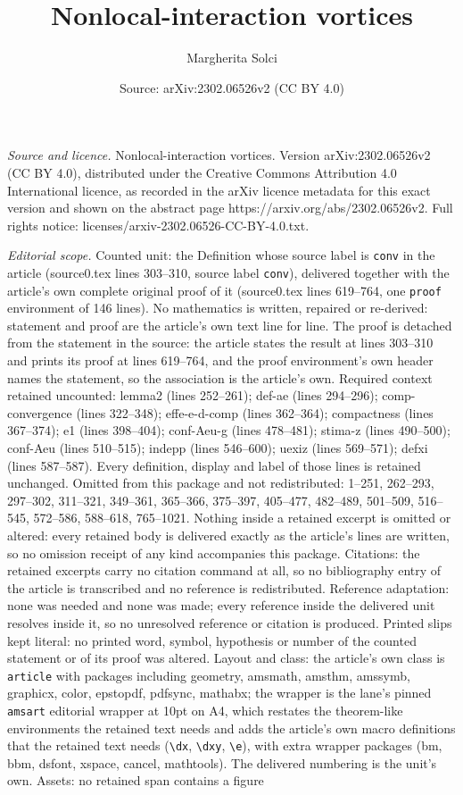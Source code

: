 \documentclass[10pt,a4paper]{amsart}
\title[Nonlocal-interaction vortices]{Nonlocal-interaction vortices}
\author{Margherita Solci}
\date{Source: arXiv:2302.06526v2 (CC BY 4.0)}
\begin{document}
\maketitle

\noindent\emph{Source and licence.} Nonlocal-interaction vortices. Version arXiv:2302.06526v2 (CC BY 4.0), distributed under the Creative Commons Attribution 4.0 International licence, as recorded in the arXiv licence metadata for this exact version and shown on the abstract page https://arxiv.org/abs/2302.06526v2. Full rights notice: licenses/arxiv-2302.06526-CC-BY-4.0.txt.\par\smallskip

\noindent\textit{Editorial scope.} Counted unit: the Definition whose source label is \texttt{conv} in the article (source0.tex lines 303--310, source label \texttt{conv}), delivered together with the article's own complete original proof of it (source0.tex lines 619--764, one \texttt{proof} environment of 146 lines). No mathematics is written, repaired or re-derived: statement and proof are the article's own text line for line. The proof is detached from the statement in the source: the article states the result at lines 303--310 and prints its proof at lines 619--764, and the proof environment's own header names the statement, so the association is the article's own. Required context retained uncounted: lemma2 (lines 252--261); def-ae (lines 294--296); comp-convergence (lines 322--348); effe-e-d-comp (lines 362--364); compactness (lines 367--374); e1 (lines 398--404); conf-Aeu-g (lines 478--481); stima-z (lines 490--500); conf-Aeu (lines 510--515); indepp (lines 546--600); uexiz (lines 569--571); defxi (lines 587--587). Every definition, display and label of those lines is retained unchanged. Omitted from this package and not redistributed: 1--251, 262--293, 297--302, 311--321, 349--361, 365--366, 375--397, 405--477, 482--489, 501--509, 516--545, 572--586, 588--618, 765--1021. Nothing inside a retained excerpt is omitted or altered: every retained body is delivered exactly as the article's lines are written, so no omission receipt of any kind accompanies this package. Citations: the retained excerpts carry no citation command at all, so no bibliography entry of the article is transcribed and no reference is redistributed. Reference adaptation: none was needed and none was made; every reference inside the delivered unit resolves inside it, so no unresolved reference or citation is produced. Printed slips kept literal: no printed word, symbol, hypothesis or number of the counted statement or of its proof was altered. Layout and class: the article's own class is \texttt{article} with packages including geometry, amsmath, amsthm, amssymb, graphicx, color, epstopdf, pdfsync, mathabx; the wrapper is the lane's pinned \texttt{amsart} editorial wrapper at 10pt on A4, which restates the theorem-like environments the retained text needs and adds the article's own macro definitions that the retained text needs (\texttt{\textbackslash dx}, \texttt{\textbackslash dxy}, \texttt{\textbackslash e}), with extra wrapper packages (bm, bbm, dsfont, xspace, cancel, mathtools). The delivered numbering is the unit's own. Assets: no retained span contains a figure 
\end{document}
